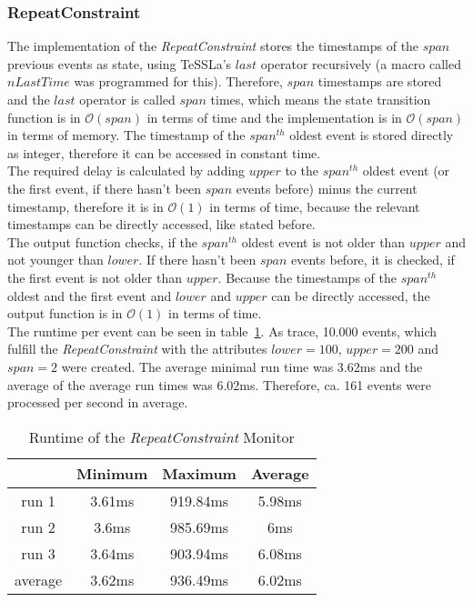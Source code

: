 \subsubsection{RepeatConstraint}
	The implementation of the \emph{RepeatConstraint} stores the timestamps of the $span$ previous events as state, using TeSSLa's $last$ operator recursively (a macro called $nLastTime$ was programmed for this). Therefore, $span$ timestamps are stored and the $last$ operator is called $span$ times, which means the state transition function is in $\mathcal{O}(span)$ in terms of time and the implementation is in $\mathcal{O}(span)$ in terms of memory. The timestamp of the $span^{th}$ oldest event is stored directly as integer, therefore it can be accessed in constant time.\\
	The required delay is calculated by adding $upper$ to the  $span^{th}$ oldest event (or the first event, if there hasn't been $span$ events before) minus the current timestamp, therefore it is in $\mathcal{O}(1)$ in terms of time, because the relevant timestamps can be directly accessed, like stated before.\\
	The output function checks, if the $span^{th}$ oldest event is not older than $upper$ and not younger than $lower$. If there hasn't been $span$ events before, it is checked, if the first event is not older than $upper$. Because the timestamps of the $span^{th}$ oldest and the first event and $lower$ and $upper$ can be directly accessed, the output function is in $\mathcal{O}(1)$ in terms of time.\\
	The runtime per event can be seen in table~\ref{tab:runtimeRepeatConstraint}. As trace, 10.000 events, which fulfill the \emph{RepeatConstraint} with the attributes $lower=100$, $upper=200$ and $span = 2$ were created. The average minimal run time was 3.62ms and the average of the average run times was 6.02ms. Therefore, ca. 161 events were processed per second in average.
	\begin{table}
		\begin{tabular}{|c|c|c|c|}
			\hline
			& Minimum & Maximum & Average \\
			\hline
			run 1	& 3.61ms & 919.84ms & 5.98ms\\
			\hline
			run 2	& 3.6ms  & 985.69ms & 6ms\\
			\hline
			run 3	& 3.64ms & 903.94ms & 6.08ms\\
			\hline
			average & 3.62ms & 936.49ms & 6.02ms\\
			\hline
		\end{tabular}
		\centering
		\label{tab:runtimeRepeatConstraint}
		\caption{Runtime of the \emph{RepeatConstraint} Monitor}
	\end{table}
	
